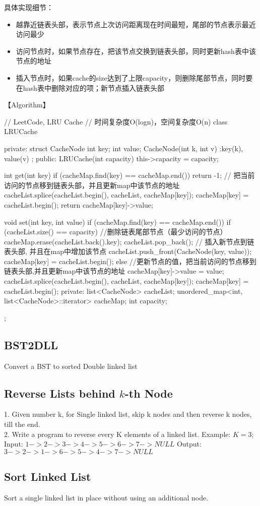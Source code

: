 具体实现细节：
\begin{itemize}
	\item{越靠近链表头部，表示节点上次访问距离现在时间最短，尾部的节点表示最近访问最少}
	\item{访问节点时，如果节点存在，把该节点交换到链表头部，同时更新hash表中该节点的地址}
	\item{插入节点时，如果cache的size达到了上限capacity，则删除尾部节点，同时要在hash表中删除对应的项；新节点插入链表头部}
	
\end{itemize}


【Algorithm】
\begin{Code}
	// LeetCode, LRU Cache
	// 时间复杂度O(logn)，空间复杂度O(n)
	class LRUCache{
	private:
		struct CacheNode {
			int key;
			int value;
			CacheNode(int k, int v) :key(k), value(v){}
		};
	public:
		LRUCache(int capacity) {
			this->capacity = capacity;
		}
		
		int get(int key) {
			if (cacheMap.find(key) == cacheMap.end()) return -1;
			// 把当前访问的节点移到链表头部，并且更新map中该节点的地址
			cacheList.splice(cacheList.begin(), cacheList, cacheMap[key]);
			cacheMap[key] = cacheList.begin();
			return cacheMap[key]->value;
		}
		
		void set(int key, int value) {
			if (cacheMap.find(key) == cacheMap.end()) {
				if (cacheList.size() == capacity) { //删除链表尾部节点（最少访问的节点）
					cacheMap.erase(cacheList.back().key);
					cacheList.pop_back();
				}
				// 插入新节点到链表头部, 并且在map中增加该节点
				cacheList.push_front(CacheNode(key, value));
				cacheMap[key] = cacheList.begin();
			} else {//更新节点的值，把当前访问的节点移到链表头部,并且更新map中该节点的地址
				cacheMap[key]->value = value;
				cacheList.splice(cacheList.begin(), cacheList, cacheMap[key]);
				cacheMap[key] = cacheList.begin();
			}
		}
	private:
		list<CacheNode> cacheList;
		unordered_map<int, list<CacheNode>::iterator> cacheMap;
		int capacity;
	};
\end{Code}


\subsection{BST2DLL}
Convert a BST to sorted Double linked list


\subsection{Reverse Lists behind $k$-th Node}
1. Given number k, for Single linked list, skip k nodes and then reverse k nodes, till the end.\\
2. Write a program to reverse every K elements of a linked list.
Example: $K = 3$;
Input: $1->2->3->4->5->6->7->NULL$
Output: $3->2->1->6->5->4->7->NULL$

\subsection{Sort Linked List}
Sort a single linked list in place without using an additional node. 